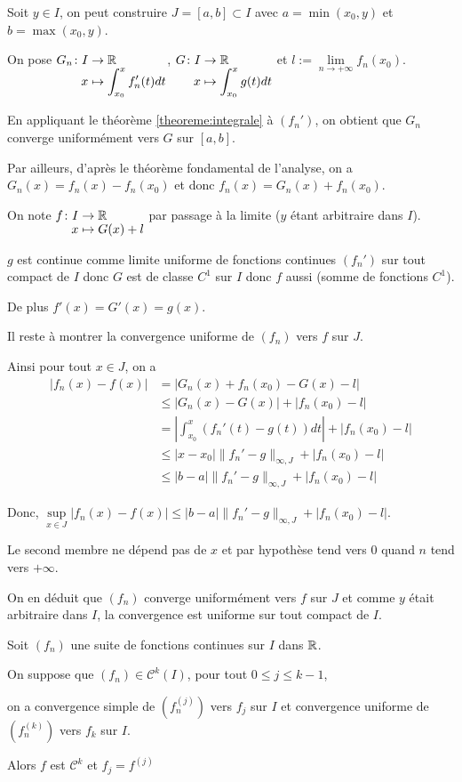 \documentclass[a4paper, 12pt]{article}
\begin{document}
\begin{demonstration}
    Soit $y \in I$, on peut construire $J = [a, b] \subset I$ avec $a = \min(x_0, y)$ et $b = \max(x_0, y)$.

    On pose $\funcdef{G_n}{I}{\R}{x}{\int_{x_0}^x f_n'(t)dt}$, $\funcdef{G}{I}{\R}{x}{\int_{x_0}^x g(t)dt}$ et $l := \lim\limits_{n \to +\infty} f_n(x_0)$.

    En appliquant le théorème \ref{theoreme:integrale} à $(f_n')$, on obtient que $G_n$ converge uniformément vers $G$ sur $[a, b]$.

    Par ailleurs, d'après le théorème fondamental de l'analyse, on a $G_n(x) = f_n(x) - f_n(x_0)$ et donc $f_n(x) = G_n(x) + f_n(x_0)$.
    
    On note $\funcdef{f}{I}{\R}{x}{G(x) + l}$ par passage à la limite ($y$ étant arbitraire dans $I$).

    $g$ est continue comme limite uniforme de fonctions continues $(f_n')$ sur tout compact de $I$ donc $G$ est de classe $C^1$ sur $I$ donc $f$ aussi (somme de fonctions $C^1$).

    De plus $f'(x) = G'(x) = g(x)$.
    
    \vspace{0.5cm}

    Il reste à montrer la convergence uniforme de $(f_n)$ vers $f$ sur $J$.

    Ainsi pour tout $x \in J$, on a
    \begin{align*}
        |f_n(x) - f(x)| &= |G_n(x) + f_n(x_0) - G(x) - l| \\
        &\leq |G_n(x) - G(x)| + |f_n(x_0) - l| \\
        &= |\int_{x_0}^x (f_n'(t) - g(t)) dt| + |f_n(x_0) - l| \\
        &\leq |x - x_0| \|f_n' - g\|_{\infty, J} + |f_n(x_0) - l| \\
        &\leq |b - a| \|f_n' - g\|_{\infty, J} + |f_n(x_0) - l|
    \end{align*}

    Donc, $\sup\limits_{x \in J} |f_n(x) - f(x)| \leq |b - a| \|f_n' - g\|_{\infty, J} + |f_n(x_0) - l|$.

    Le second membre ne dépend pas de $x$ et par hypothèse tend vers $0$ quand $n$ tend vers $+\infty$.

    On en déduit que $(f_n)$ converge uniformément vers $f$ sur $J$ et comme $y$ était arbitraire dans $I$, la convergence est uniforme sur tout compact de $I$.
\end{demonstration}

\begin{proposition}{}{}
    Soit $(f_n)$ une suite de fonctions continues sur $I$ dans $\mathbb{R}$.

    On suppose que $(f_n) \in \mathcal{C}^k(I)$, pour tout $0 \leq j \leq k - 1$,

    on a convergence simple de $(f_n^{(j)})$ vers $f_j$ sur $I$ et convergence uniforme de $(f_n^{(k)})$ vers $f_k$ sur $I$.

    Alors $f$ est $\mathcal{C}^k$ et $f_j = f^{(j)}$
\end{proposition}
\end{document}
